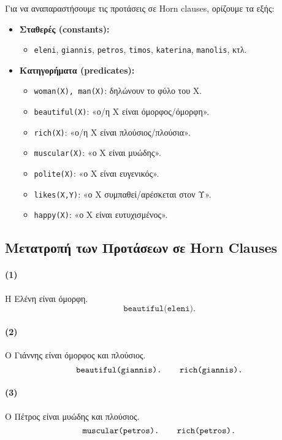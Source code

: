 \documentclass[a4paper,12pt]{article}
\begin{document}
Για να αναπαραστήσουμε τις προτάσεις σε Horn clauses, ορίζουμε τα εξής:
\begin{itemize}
    \item \textbf{Σταθερές (constants):}
    \begin{itemize}
        \item \texttt{eleni}, \texttt{giannis}, \texttt{petros}, \texttt{timos}, \texttt{katerina}, \texttt{manolis}, κτλ.
    \end{itemize}
    \item \textbf{Κατηγορήματα (predicates):}
    \begin{itemize}
        \item \texttt{woman(X), man(X)}: δηλώνουν το φύλο του X.
        \item \texttt{beautiful(X)}: «ο/η X είναι όμορφος/όμορφη».
        \item \texttt{rich(X)}: «ο/η X είναι πλούσιος/πλούσια».
        \item \texttt{muscular(X)}: «ο Χ είναι μυώδης».
        \item \texttt{polite(X)}: «ο Χ είναι ευγενικός».
        \item \texttt{likes(X,Y)}: «ο Χ συμπαθεί/αρέσκεται στον Υ».
        \item \texttt{happy(X)}: «ο Χ είναι ευτυχισμένος».
    \end{itemize}
\end{itemize}

\subsection*{Μετατροπή των Προτάσεων σε Horn Clauses}

\paragraph{(1)} Η Ελένη είναι όμορφη.
\[
\texttt{beautiful(eleni).}
\]

\paragraph{(2)} Ο Γιάννης είναι όμορφος και πλούσιος.
\[
\texttt{beautiful(giannis). \quad rich(giannis).}
\]

\paragraph{(3)} Ο Πέτρος είναι μυώδης και πλούσιος.
\[
\texttt{muscular(petros). \quad rich(petros).}
\]
\end{document}
